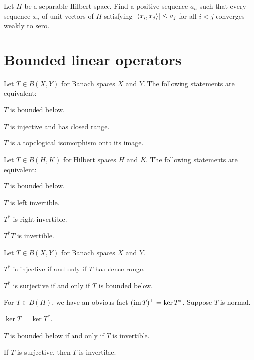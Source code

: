 \documentclass{../../large}
\begin{document}
Let $H$ be a separable Hilbert space.
Find a positive sequence $a_n$ such that every sequence $x_n$ of unit vectors of $H$ satisfying $|\langle x_i,x_j\rangle|\le a_j$ for all $i<j$ converges weakly to zero.






\chapter{Bounded linear operators}
\begin{prb}
Let $T\in B(X,Y)$ for Banach spaces $X$ and $Y$.
The following statements are equivalent:
\begin{parts}
\item $T$ is bounded below.
\item $T$ is injective and has closed range.
\item $T$ is a topological isomorphism onto its image.
\end{parts}
\end{prb}

\begin{prb}
Let $T\in B(H,K)$ for Hilbert spaces $H$ and $K$.
The following statements are equivalent:
\begin{parts}
\item $T$ is bounded below.
\item $T$ is left invertible.
\item $T^*$ is right invertible.
\item $T^*T$ is invertible.
\end{parts}
\end{prb}

\begin{prb}
Let $T\in B(X,Y)$ for Banach spaces $X$ and $Y$.
\begin{parts}
\item $T^*$ is injective if and only if $T$ has dense range.
\item $T^*$ is surjective if and only if $T$ is bounded below.
\end{parts}
\end{prb}

\begin{prb}
For $T\in B(H)$, we have an obvious fact $(\operatorname{im} T)^\perp=\ker T^*$.
Suppose $T$ is normal.
\begin{parts}
\item $\ker T=\ker T^*$.
\item $T$ is bounded below if and only if $T$ is invertible.
\item If $T$ is surjective, then $T$ is invertible.
\end{parts}
\end{prb}
\end{document}
